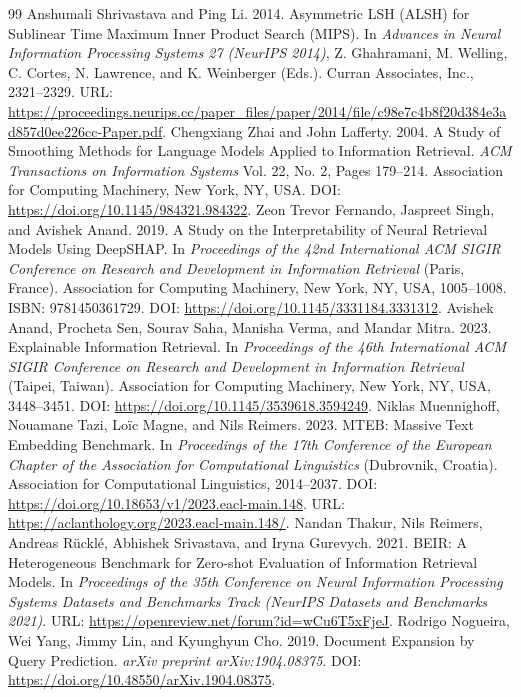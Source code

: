 \documentclass[sigconf,anonymous,screen]{acmart}
\begin{document}
\begin{thebibliography}{99}
 Anshumali Shrivastava and Ping Li. 2014. Asymmetric LSH (ALSH) for Sublinear Time Maximum Inner Product Search (MIPS). In \textit{Advances in Neural Information Processing Systems 27 (NeurIPS 2014)}, Z. Ghahramani, M. Welling, C. Cortes, N. Lawrence, and K. Weinberger (Eds.). Curran Associates, Inc., 2321--2329. URL: \url{https://proceedings.neurips.cc/paper_files/paper/2014/file/c98e7c4b8f20d384e3ad857d0ee226cc-Paper.pdf}.
 Chengxiang Zhai and John Lafferty. 2004. A Study of Smoothing Methods for Language Models Applied to Information Retrieval. \textit{ACM Transactions on Information Systems} Vol. 22, No. 2, Pages 179--214. Association for Computing Machinery, New York, NY, USA. DOI: \url{https://doi.org/10.1145/984321.984322}.
 Zeon Trevor Fernando, Jaspreet Singh, and Avishek Anand. 2019. A Study on the Interpretability of Neural Retrieval Models Using DeepSHAP. In \textit{Proceedings of the 42nd International ACM SIGIR Conference on Research and Development in Information Retrieval} (Paris, France). Association for Computing Machinery, New York, NY, USA, 1005--1008. ISBN: 9781450361729. DOI: \url{https://doi.org/10.1145/3331184.3331312}.
 Avishek Anand, Procheta Sen, Sourav Saha, Manisha Verma, and Mandar Mitra. 2023. Explainable Information Retrieval. In \textit{Proceedings of the 46th International ACM SIGIR Conference on Research and Development in Information Retrieval} (Taipei, Taiwan). Association for Computing Machinery, New York, NY, USA, 3448--3451. DOI: \url{https://doi.org/10.1145/3539618.3594249}.
 Niklas Muennighoff, Nouamane Tazi, Lo{\"i}c Magne, and Nils Reimers. 2023. MTEB: Massive Text Embedding Benchmark. In \textit{Proceedings of the 17th Conference of the European Chapter of the Association for Computational Linguistics} (Dubrovnik, Croatia). Association for Computational Linguistics, 2014--2037. DOI: \url{https://doi.org/10.18653/v1/2023.eacl-main.148}. URL: \url{https://aclanthology.org/2023.eacl-main.148/}.
 Nandan Thakur, Nils Reimers, Andreas R{\"u}ckl{\'e}, Abhishek Srivastava, and Iryna Gurevych. 2021. BEIR: A Heterogeneous Benchmark for Zero-shot Evaluation of Information Retrieval Models. In \textit{Proceedings of the 35th Conference on Neural Information Processing Systems Datasets and Benchmarks Track (NeurIPS Datasets and Benchmarks 2021)}. URL: \url{https://openreview.net/forum?id=wCu6T5xFjeJ}.
 Rodrigo Nogueira, Wei Yang, Jimmy Lin, and Kyunghyun Cho. 2019. Document Expansion by Query Prediction. \textit{arXiv preprint arXiv:1904.08375}. DOI: \url{https://doi.org/10.48550/arXiv.1904.08375}.

\end{thebibliography}
\end{document}
